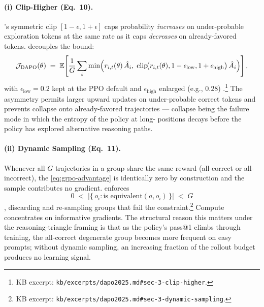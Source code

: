 \paragraph{(i) Clip-Higher (Eq.\ 10).} 's symmetric clip
$[1 - \epsilon, 1 + \epsilon]$ caps probability \emph{increases} on
under-probable exploration tokens at the same rate as it caps
\emph{decreases} on already-favored tokens.  decouples the bound:
\begin{equation}
\mathcal{J}_{\mathrm{DAPO}}(\theta) \;=\; \operatorname{\mathbb{E}}\!\left[\frac{1}{G} \sum_i \min\!\Big( r_{i,t}(\theta)\, \hat{A}_i,\; \mathrm{clip}\!\big(r_{i,t}(\theta), 1 - \epsilon_{\mathrm{low}}, 1 + \epsilon_{\mathrm{high}}\big)\, \hat{A}_i \Big) \right],
\label{eq:dapo-clip}
\end{equation}
with $\epsilon_{\mathrm{low}} = 0.2$ kept at the PPO default and
$\epsilon_{\mathrm{high}}$ enlarged (e.g., $0.28$) \citep[Eq.\
10]{dapo2025}.\footnote{KB excerpt:
\texttt{kb/excerpts/dapo2025.md\#sec-3-clip-higher}.} The asymmetry
permits larger upward updates on under-probable correct tokens and
prevents collapse onto already-favored trajectories --- collapse being
the failure mode in which the entropy of the policy at long-
positions decays before the policy has explored alternative reasoning
paths.

\paragraph{(ii) Dynamic Sampling (Eq.\ 11).} Whenever all $G$
trajectories in a group share the same reward (all-correct or
all-incorrect), the  \cref{eq:grpo-advantage}
is identically zero by construction and the sample contributes no
gradient. \glsterm{dapo-2}{DAPO} enforces
\begin{equation}
0 \;<\; \big| \{\, o_i : \mathrm{is\_equivalent}(a, o_i) \,\}\big| \;<\; G
\label{eq:dapo-dynsample}
\end{equation}
\citep[Eq.\ 11]{dapo2025}, discarding and re-sampling groups that fail
the constraint.\footnote{KB excerpt:
\texttt{kb/excerpts/dapo2025.md\#sec-3-dynamic-sampling}.} Compute
concentrates on informative gradients. The structural reason this
matters under the reasoning-triangle framing is that as the policy's
pass@1 climbs through training, the all-correct degenerate group
becomes more frequent on easy prompts; without dynamic sampling, an
increasing fraction of the rollout budget produces no learning signal.

